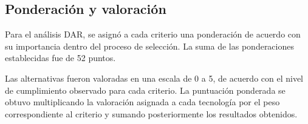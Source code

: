 \subsection{Ponderación y valoración}\label{subsec:dar-ponderacion}

Para el análisis \ac{DAR}, se asignó a cada criterio una ponderación de acuerdo con su importancia dentro del proceso de selección. La suma de las ponderaciones establecidas fue de 52 puntos.

Las alternativas fueron valoradas en una escala de 0 a 5, de acuerdo con el nivel de cumplimiento observado para cada criterio. La puntuación ponderada se obtuvo multiplicando la valoración asignada a cada tecnología por el peso correspondiente al criterio y sumando posteriormente los resultados obtenidos.
